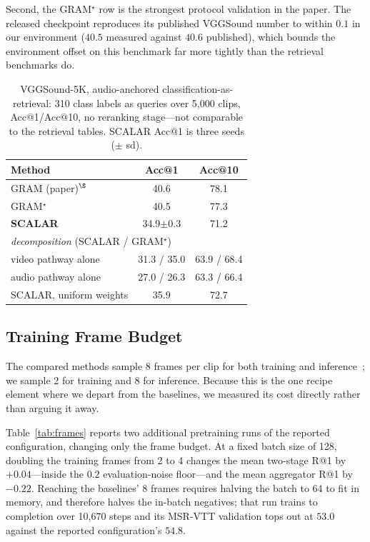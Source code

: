 \documentclass[10pt,twocolumn,letterpaper]{article}
\newcommand{\ours}{SCALAR}
\begin{document}
Second, the GRAM$^{\star}$ row is the strongest protocol validation in the
paper. The released checkpoint reproduces its published VGGSound number to
within $0.1$ in our environment ($40.5$ measured against $40.6$ published),
which bounds the environment offset on this benchmark far more tightly than the
retrieval benchmarks do.

\begin{table}[t]
\centering
\caption{VGGSound-5K, audio-anchored classification-as-retrieval: 310 class
labels as queries over 5{,}000 clips, Acc@1/Acc@10, no reranking stage---not
comparable to the retrieval tables. \ours{} Acc@1 is three seeds ($\pm$ sd).}
\label{tab:vggsound}
\small
\setlength{\tabcolsep}{6pt}
\begin{tabular}{lcc}
\toprule
Method & Acc@1 & Acc@10 \\
\midrule
GRAM (paper)$^{\S}$ & 40.6 & 78.1 \\
GRAM$^{\star}$ & 40.5 & 77.3 \\
\textbf{\ours{}} & 34.9\tiny{$\pm$0.3} & 71.2 \\
\midrule
\multicolumn{3}{l}{\emph{decomposition} (\ours{} / GRAM$^{\star}$)} \\
\quad video pathway alone & 31.3 / 35.0 & 63.9 / 68.4 \\
\quad audio pathway alone & 27.0 / 26.3 & 63.3 / 66.4 \\
\quad \ours{}, uniform weights & 35.9 & 72.7 \\
\bottomrule
\end{tabular}
\end{table}

\subsection{Training Frame Budget}
\label{sec:frames}

The compared methods sample 8 frames per clip for both training and
inference~\cite{cicchetti2025gramian}; we sample 2 for training and 8 for
inference. Because this is the one recipe element where we depart from the
baselines, we measured its cost directly rather than arguing it away.

Table~\ref{tab:frames} reports two additional pretraining runs of the reported
configuration, changing only the frame budget. At a fixed batch size of 128,
doubling the training frames from 2 to 4 changes the mean two-stage
R@1 by $+0.04$---inside the $0.2$ evaluation-noise floor---and the mean
aggregator R@1 by $-0.22$. Reaching the baselines' 8 frames requires halving
the batch to 64 to fit in memory, and therefore halves the in-batch negatives;
that run trains to completion over 10{,}670 steps and its MSR-VTT validation
tops out at $53.0$ against the reported configuration's $54.8$.
\end{document}
